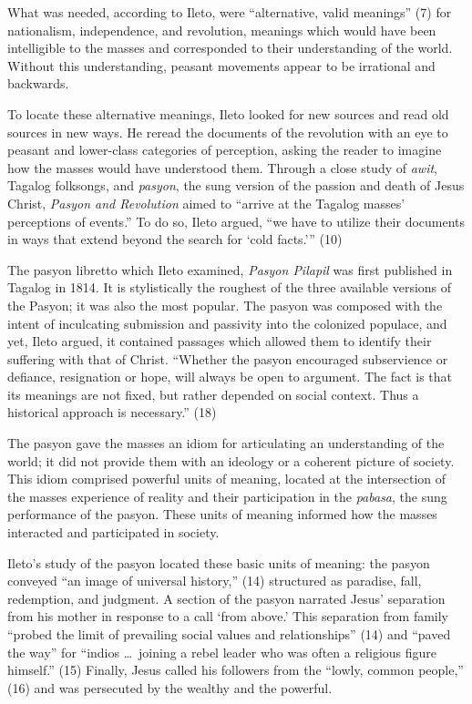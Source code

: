 What was needed, according to Ileto, were \enquote{alternative, valid meanings} (7) for nationalism, independence, and revolution, meanings which would have been intelligible to the masses and corresponded to their understanding of the world. Without this understanding, peasant movements appear to be irrational and backwards.

To locate these alternative meanings, Ileto looked for new sources and read old sources in new ways. He reread the documents of the revolution with an eye to peasant and lower-class categories of perception, asking the reader to imagine how the masses would have understood them. Through a close study of \textit{awit}, Tagalog folksongs, and \textit{pasyon}, the sung version of the passion and death of Jesus Christ, \textit{Pasyon and Revolution} aimed to \enquote{arrive at the Tagalog masses' perceptions of events.} To do so, Ileto argued, \enquote{we have to utilize their documents in ways that extend beyond the search for \enquote{cold facts.}} (10)

The pasyon libretto which Ileto examined, \textit{Pasyon Pilapil} was first published in Tagalog in 1814. It is stylistically the roughest of the three available versions of the Pasyon; it was also the most popular. The pasyon was composed with the intent of inculcating submission and passivity into the colonized populace, and yet, Ileto argued, it contained passages which allowed them to identify their suffering with that of Christ. \enquote{Whether the pasyon encouraged subservience or defiance, resignation or hope, will always be open to argument. The fact is that its meanings are not fixed, but rather depended on social context. Thus a historical approach is necessary.} (18)

The pasyon gave the masses an idiom for articulating an understanding of the world; it did not provide them with an ideology or a coherent picture of society. This idiom comprised powerful units of meaning, located at the intersection of the masses experience of reality and their participation in the \textit{pabasa}, the sung performance of the pasyon. These units of meaning informed how the masses interacted and participated in society.

Ileto's study of the pasyon located these basic units of meaning: the pasyon conveyed \enquote{an image of universal history,} (14) structured as paradise, fall, redemption, and judgment. A section of the pasyon narrated Jesus' separation from his mother in response to a call \enquote*{from above.} This separation from family \enquote{probed the limit of prevailing social values and relationships} (14) and \enquote{paved the way} for \enquote{indios \ldots\ joining a rebel leader who was often a religious figure himself.} (15) Finally, Jesus called his followers from the \enquote{lowly, common people,} (16) and was persecuted by the wealthy and the powerful.

